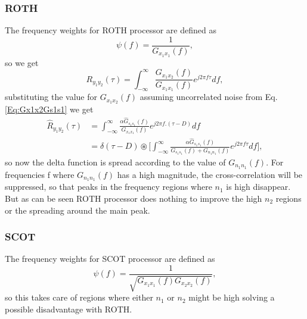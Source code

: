 \subsubsection{ROTH}
The frequency weights for ROTH processor are defined as
\begin{equation}
            \psi(f) = \frac{1}{G_{x_1x_1}(f)},
\end{equation}
so we get 
\begin{equation}
            {R}_{y_1y_2}(\tau) = \int_{-\infty}^{\infty}\frac{{G}_{x_1x_2}(f)}{G_{x_1x_1}(f)} e^{j2\pi f\tau} df,
\end{equation}
substituting the value for ${G}_{x_1x_2}(f)$ assuming uncorrelated noise from Eq. \ref{Eq:Gx1x2Gs1s1} we get
\begin{equation}
\begin{split}
                \hat{R}_{y_1y_2}(\tau) &= \int_{-\infty}^{\infty}\frac{\alpha\hat{G}_{s_1s_1}(f)}{G_{x_1x_1}(f)} e^{j2\pi f.(\tau-D)} df \\
                                        &= \delta (\tau - D) \circledast \bigg[\int_{-\infty}^{\infty}\frac{\alpha\hat{G}_{s_1s_1}(f)}{G_{s_1s_1}(f) + G_{n_1n_1}(f)} e^{j2\pi f\tau}  df\bigg],
\end{split}
\end{equation}
so now the delta function is spread according to the value of $G_{n_1n_1}(f)$. For frequencies f where $G_{n_1n_1}(f)$ has a high magnitude, the cross-correlation will be suppressed, so that peaks in the frequency regions where $n_1$ is high disappear. But as can be seen ROTH processor does nothing to improve the high $n_2$ regions or the spreading around the main peak.

\subsubsection{SCOT}
The frequency weights for SCOT processor are defined as
\begin{equation}
            \psi(f) = \frac{1}{\sqrt{G_{x_1x_1}(f)G_{x_2x_2}(f)}},
\end{equation}
so this takes care of regions where either $n_1$ or $n_2$ might be high solving a possible disadvantage with ROTH. 

